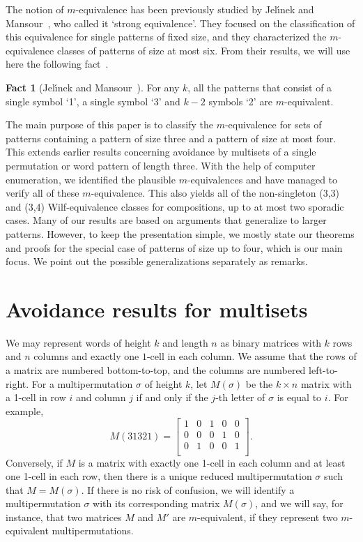 \documentclass[11pt]{amsart}
\theoremstyle{plain}
\theoremstyle{definition}
\newtheorem{fact}[theorem]{Fact}
\begin{document}
The notion of $m$-equivalence has been previously studied by Jel\'\i nek and Mansour~\cite{JM1},
who called it `strong equivalence'. They focused on the classification of this equivalence for
single patterns of fixed size, and they characterized the $m$-equivalence classes of patterns of
size at most six. From their results, we will use here the following
fact~\cite[Lemma~2.4]{JM1}.

\begin{fact}[Jel\'\i nek and Mansour~\cite{JM1}]\label{fac-1223}
For any $k$, all the patterns that consist of a single symbol `1', a single
symbol `3' and $k-2$ symbols `2' are $m$-equivalent.
\end{fact}

The main purpose of this paper is to classify the $m$-equivalence for sets of patterns containing a
pattern of size three and a pattern of size at most four. This extends earlier results concerning avoidance by multisets of a single permutation \cite{SavWilf} or word \cite{HMM} pattern of length three.  With the help of computer enumeration, we
identified the plausible $m$-equivalences and have managed to verify all of these $m$-equivalence.  This also yields all of the non-singleton (3,3) and (3,4) Wilf-equivalence classes for compositions, up to at most two sporadic cases. Many of our results are based on
arguments that generalize to larger patterns. However, to keep the presentation simple, we mostly
state our theorems and proofs for the special case of patterns of size up to four, which is our main
focus. We point out the possible generalizations separately as remarks.


\section{Avoidance results for multisets}

We may represent words of height $k$ and length $n$ as binary matrices with $k$ rows and $n$ columns
and exactly one $1$-cell in each column. We assume that the rows of a matrix are numbered
bottom-to-top, and the columns are numbered left-to-right. For a multipermutation $\sigma$
of height $k$, let $M(\sigma)$ be the $k\times n$ matrix with a 1-cell in row $i$ and column $j$ if
and only if the $j$-th letter of $\sigma$ is equal to $i$. For example,
$$M(31321)=\begin{bmatrix}
1& 0& 1& 0 & 0 \\
0& 0& 0& 1& 0 \\
0& 1& 0& 0 & 1 \\
\end{bmatrix}.$$
Conversely, if $M$ is a matrix with exactly one 1-cell in each column and at least one 1-cell in
each row, then there is a unique reduced multipermutation $\sigma$ such that $M=M(\sigma)$. If
there is no risk of confusion, we will identify a multipermutation $\sigma$ with its corresponding
matrix $M(\sigma)$, and we will say, for instance, that two matrices $M$ and $M'$ are
$m$-equivalent, if they represent two $m$-equivalent multipermutations.
\end{document}
